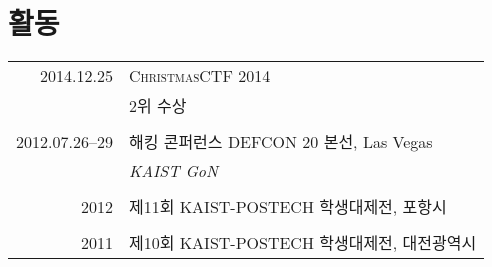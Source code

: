 \documentclass[a4paper,10pt]{article}
\begin{document}
\section{활동}
\begin{tabular}{r|p{11cm}}
  \textsc{2014.12.25} & \textsc{ChristmasCTF 2014} \\
  & 2위 수상 \\
  \multicolumn{2}{c}{} \\

  \textsc{2012.07.26--29} & \textsc{해킹 콘퍼런스 DEFCON 20 본선}, Las Vegas \\
  & \emph{KAIST GoN} \\
  \multicolumn{2}{c}{} \\

  \textsc{2012} & \textsc{제11회 KAIST-POSTECH 학생대제전}, 포항시 \\
  \multicolumn{2}{c}{} \\

  \textsc{2011} & \textsc{제10회 KAIST-POSTECH 학생대제전}, 대전광역시 \\
\end{tabular}


%

\end{document}
